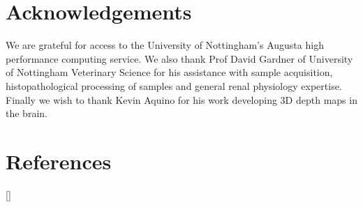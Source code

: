 \section{Acknowledgements}

We are grateful for access to the University of Nottingham's Augusta high performance computing service. We also thank Prof David Gardner of University of Nottingham Veterinary Science for his assistance with sample acquisition, histopathological processing of samples and general renal physiology expertise. Finally we wish to thank Kevin Aquino for his work developing 3D depth maps in the brain.

\newpage
\section{References}
[\refname]{}
\printbibliography